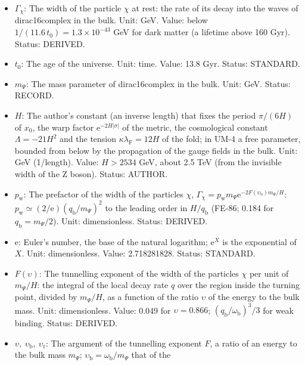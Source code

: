 \documentclass[
  10pt,
]{article}
\providecommand{\tightlist}{%
  \setlength{\itemsep}{0pt}\setlength{\parskip}{0pt}}
\begin{document}
\begin{itemize}
\tightlist
\item
  \(\Gamma_\chi\): The width of the particle \(\chi\) at rest: the rate
  of its decay into the waves of dirac16complex in the bulk. Unit: GeV.
  Value: below \(1/(11.6\,t_0) = 1.3\times10^{-43}\) GeV for dark matter
  (a lifetime above 160 Gyr). Status: DERIVED.
\item
  \(t_0\): The age of the universe. Unit: time. Value: 13.8 Gyr. Status:
  STANDARD.
\item
  \(m_\Psi\): The mass parameter of dirac16complex in the bulk. Unit:
  GeV. Status: RECORD.
\item
  \(H\): The author's constant (an inverse length) that fixes the period
  \(\pi/(6H)\) of \(x_0\), the warp factor
  \(\mathrm{e}^{-2H\lvert\sigma\rvert}\) of the metric, the cosmological
  constant \(\Lambda = -21H^2\) and the tension
  \(\kappa\lambda_{\mathrm{F}} = 12H\) of the fold; in UM-4 a free
  parameter, bounded from below by the propagation of the gauge fields
  in the bulk. Unit: GeV (1/length). Value: \(H > 2534\) GeV, about 2.5
  TeV (from the invisible width of the Z boson). Status: AUTHOR.
\item
  \(p_{\mathrm{w}}\): The prefactor of the width of the particles
  \(\chi\),
  \(\Gamma_\chi = p_{\mathrm{w}}m_\Psi\mathrm{e}^{-2F(\upsilon_{\mathrm{b}})m_\Psi/H}\):
  \(p_{\mathrm{w}} \simeq (2/\mathrm{e})(q_{\mathrm{b}}/m_\Psi)^2\) to
  the leading order in \(H/q_{\mathrm{b}}\) (FE-86; 0.184 for
  \(q_{\mathrm{b}} = m_\Psi/2\)). Unit: dimensionless. Status: DERIVED.
\item
  \(\mathrm{e}\): Euler's number, the base of the natural logarithm;
  \(\mathrm{e}^{X}\) is the exponential of \(X\). Unit: dimensionless.
  Value: 2.718281828. Status: STANDARD.
\item
  \(F(\upsilon)\): The tunnelling exponent of the width of the particles
  \(\chi\) per unit of \(m_\Psi/H\): the integral of the local decay
  rate \(q\) over the region inside the turning point, divided by
  \(m_\Psi/H\), as a function of the ratio \(\upsilon\) of the energy to
  the bulk mass. Unit: dimensionless. Value: 0.049 for
  \(\upsilon = 0.866\); \((q_{\mathrm{b}}/\omega_{\mathrm{b}})^3/3\) for
  weak binding. Status: DERIVED.
\item
  \(\upsilon,\ \upsilon_{\mathrm{b}},\ \upsilon_{\mathrm{r}}\): The
  argument of the tunnelling exponent \(F\), a ratio of an energy to the
  bulk mass \(m_\Psi\);
  \(\upsilon_{\mathrm{b}} = \omega_{\mathrm{b}}/m_\Psi\) that of the

\end{itemize}
\end{document}
